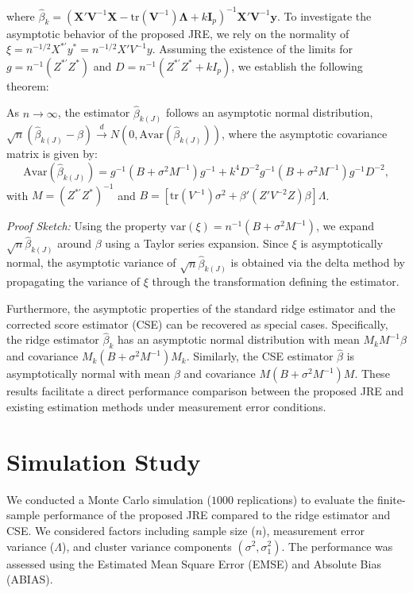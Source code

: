 \documentclass[twoside]{article}
\begin{document}
where $\hat{\beta}_k = (\mathbf{X}'\mathbf{V}^{-1}\mathbf{X} - \text{tr}(\mathbf{V}^{-1})\mathbf{\Lambda} + k\mathbf{I}_p)^{-1}\mathbf{X}'\mathbf{V}^{-1}\mathbf{y}$.
To investigate the asymptotic behavior of the proposed JRE, we rely on the normality of $\xi = n^{-1/2}X^{*'}y^* = n^{-1/2}X'V^{-1}y$. Assuming the existence of the limits for $g = n^{-1}(Z^{*'}Z^*)$ and $D = n^{-1}(Z^{*'}Z^* + kI_p)$, we establish the following theorem:

\begin{theorem}
As $n \to \infty$, the estimator $\hat{\beta}_{k(J)}$ follows an asymptotic normal distribution,\\ $\sqrt{n}(\hat{\beta}_{k(J)} - \beta) \xrightarrow{d} N(0, \text{Avar}(\hat{\beta}_{k(J)}))$, where the asymptotic covariance matrix is given by:
\begin{equation}
\text{Avar}(\hat{\beta}_{k(J)}) = g^{-1}(B + \sigma^2 M^{-1})g^{-1} + k^4 D^{-2}g^{-1}(B + \sigma^2 M^{-1})g^{-1}D^{-2},
\end{equation}
with $M = (Z^{*'}Z^*)^{-1}$ and $B = [\text{tr}(V^{-1})\sigma^2 + \beta'(Z'V^{-2}Z)\beta]\Lambda$.
\end{theorem}


\textit{Proof Sketch:} Using the property $\text{var}(\xi)=n^{-1}(B+\sigma^2 M^{-1})$, we expand $\sqrt{n}\hat{\beta}_{k(J)}$ around $\beta$ using a Taylor series expansion. Since $\xi$ is asymptotically normal, the asymptotic variance of $\sqrt{n}\hat{\beta}_{k(J)}$ is obtained via the delta method by propagating the variance of $\xi$ through the transformation defining the estimator.

Furthermore, the asymptotic properties of the standard ridge estimator and the corrected score estimator (CSE) can be recovered as special cases. Specifically, the ridge estimator $\hat{\beta}_k$ has an asymptotic normal distribution with mean $M_k M^{-1}\beta$ and covariance $M_k(B + \sigma^2 M^{-1})M_k$. Similarly, the CSE  estimator $\hat{\beta}$ is asymptotically normal with mean $\beta$ and covariance $M(B + \sigma^2 M^{-1})M$. These results facilitate a direct performance comparison between the proposed JRE and existing estimation methods under measurement error conditions.
\section{Simulation Study}\label{Simulation}

We conducted a Monte Carlo simulation ($1000$ replications) to evaluate the finite-sample performance of the proposed JRE compared to the ridge  estimator and CSE. We considered factors including sample size ($n$), measurement error variance ($\Lambda$), and cluster variance components $(\sigma^2, \sigma_1^2)$. The performance was assessed using the Estimated Mean Square Error (EMSE) and Absolute Bias (ABIAS).
\end{document}
